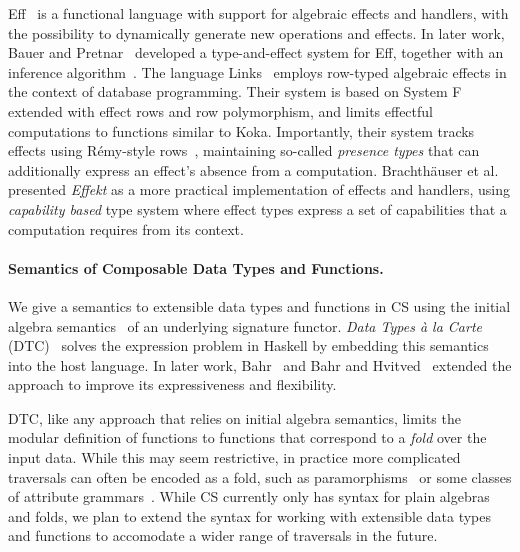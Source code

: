 \documentclass[runningheads]{llncs}
\newcommand{\strachey}{\textsc{CS}}
\begin{document}
Eff~\cite{DBLP:journals/jlp/BauerP15} is a functional language with support for
algebraic effects and handlers, with the possibility to dynamically generate new
operations and effects. In later work, Bauer and
Pretnar~\cite{DBLP:journals/corr/BauerP13} developed a type-and-effect system
for Eff, together with an inference
algorithm~\cite{DBLP:journals/corr/Pretnar13}. The language
Links~\cite{DBLP:conf/tldi/LindleyC12} employs row-typed algebraic effects in
the context of database programming. Their system is based on System F extended
with effect rows and row polymorphism, and limits effectful computations to
functions similar to Koka. Importantly, their system tracks effects using
R\'emy-style rows~\cite{DBLP:conf/popl/Remy89}, maintaining so-called
\emph{presence types} that can additionally express an effect's absence from a
computation. Brachth{\"{a}}user et
al.~\cite{DBLP:journals/pacmpl/BrachthauserSO20} presented \emph{Effekt} as a
more practical implementation of effects and handlers, using \emph{capability
  based} type system where effect types express a set of capabilities that a
computation requires from its context.

\paragraph{Semantics of Composable Data Types and Functions.}

We give a semantics to extensible data types and functions in \strachey{} using
the initial algebra semantics~\cite{DBLP:conf/tlca/JohannG07} of an underlying
signature functor. \emph{Data Types \`a la Carte}
(DTC)~\cite{DBLP:journals/jfp/Swierstra08} solves the expression problem in
Haskell by embedding this semantics into the host language. In later work,
Bahr~\cite{DBLP:conf/icfp/Bahr14} and Bahr and
Hvitved~\cite{DBLP:conf/icfp/BahrH11,DBLP:journals/corr/abs-1202-2917} extended
the approach to improve its expressiveness and flexibility.

DTC, like any approach that relies on initial algebra semantics, limits the
modular definition of functions to functions that correspond to a \emph{fold}
over the input data. While this may seem restrictive, in practice more
complicated traversals can often be encoded as a fold, such as
paramorphisms~\cite{DBLP:conf/fpca/MeijerFP91} or some classes of attribute
grammars~\cite{DBLP:conf/fpca/Johnsson87}. While \strachey{} currently only has
syntax for plain algebras and folds, we plan to extend the syntax for working
with extensible data types and functions to accomodate a wider range of
traversals in the future.
\end{document}
